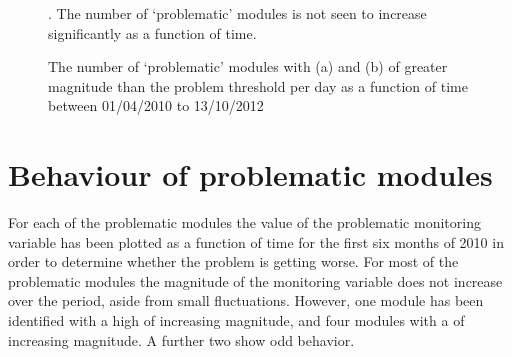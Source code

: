\begin{figure}
	\centering
	\caption{The number of `problematic' modules with (a) \deltat and (b) \tdiff of greater magnitude than the problem threshold per day as a function of time between 01/04/2010 to 13/10/2012}. The number of `problematic' modules is not seen to increase significantly as a function of time.
	\label{fig:num_pm}
\end{figure}

\section{Behaviour of problematic modules}

For each of the problematic modules the value of the problematic monitoring variable has been plotted as a function of time for the first six months of 2010 in order to determine whether the problem is getting worse. For most of the problematic modules the magnitude of the monitoring variable does not increase over the period, aside from small fluctuations.  However, one module has been identified with a high \deltat of increasing magnitude, and four modules with a \tdiff of increasing magnitude. A further two show odd behavior. 

